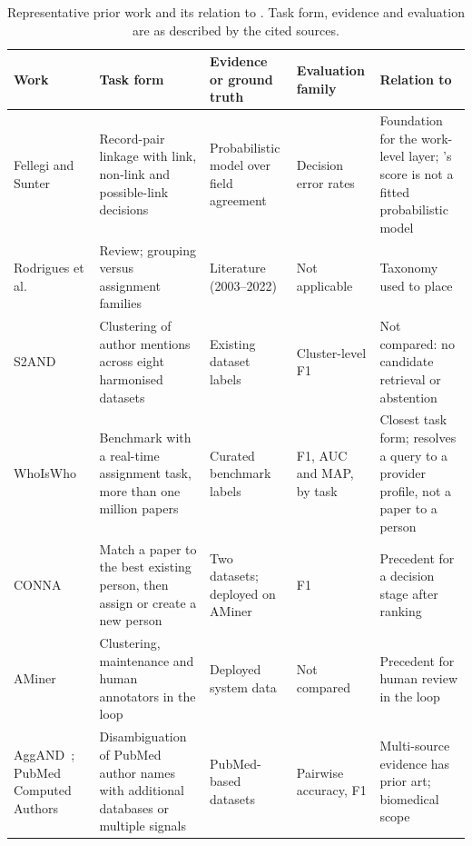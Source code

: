 \begin{table}[t]
\caption{Representative prior work and its relation to \hammer{}. Task form, evidence and evaluation are as described by the cited sources.}
\label{tab:literature}
\centering
\footnotesize
\renewcommand{\arraystretch}{1.15}
\begin{tabular}{@{}p{}p{}p{}p{}p{}@{}}
\toprule
\textbf{Work} & \textbf{Task form} & \textbf{Evidence or ground truth} & \textbf{Evaluation family} & \textbf{Relation to \hammer{}} \\
\midrule
Fellegi and Sunter~\cite{fellegi1969recordlinkage} & Record-pair linkage with link, non-link and possible-link decisions & Probabilistic model over field agreement & Decision error rates & Foundation for the work-level layer; \hammer{}'s score is not a fitted probabilistic model \\
Rodrigues et al.~\cite{rodrigues2024andreview} & Review; grouping versus assignment families & Literature (2003--2022) & Not applicable & Taxonomy used to place \hammer{} \\
S2AND~\cite{subramanian2021s2and} & Clustering of author mentions across eight harmonised datasets & Existing dataset labels & Cluster-level F1 & Not compared: no candidate retrieval or abstention \\
WhoIsWho~\cite{chen2023whoiswho} & Benchmark with a real-time assignment task, more than one million papers & Curated benchmark labels & F1, AUC and MAP, by task & Closest task form; \hammer{} resolves a query to a provider profile, not a paper to a person \\
CONNA~\cite{chen2020conna} & Match a paper to the best existing person, then assign or create a new person & Two datasets; deployed on AMiner & F1 & Precedent for a decision stage after ranking \\
AMiner~\cite{zhang2018aminerhitl} & Clustering, maintenance and human annotators in the loop & Deployed system data & Not compared & Precedent for human review in the loop \\
AggAND~\cite{zhang2021aggand}; PubMed Computed Authors~\cite{tian2024pubmedcomputedauthors} & Disambiguation of PubMed author names with additional databases or multiple signals & PubMed-based datasets & Pairwise accuracy, F1 & Multi-source evidence has prior art; biomedical scope \\

\end{tabular}
\end{table}
